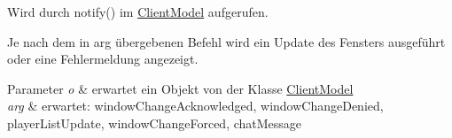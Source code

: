 Wird durch notify() im \hyperlink{a00013}{Client\-Model} aufgerufen. 

Je nach dem in arg übergebenen Befehl wird ein Update des Fensters ausgeführt oder eine Fehlermeldung angezeigt.


\begin{DoxyParams}{Parameter}
{\em o} & erwartet ein Objekt von der Klasse \hyperlink{a00013}{Client\-Model} \\
\hline
{\em arg} & erwartet\-: window\-Change\-Acknowledged, window\-Change\-Denied, player\-List\-Update, window\-Change\-Forced, chat\-Message \\
\hline
\end{DoxyParams}
